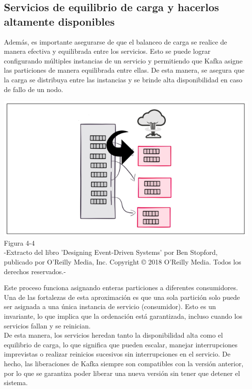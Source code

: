 \documentclass{article}
\begin{document}
\subsection{Servicios de equilibrio de carga y hacerlos altamente disponibles}
Además, es importante asegurarse de que el balanceo de carga se realice de manera efectiva y equilibrada entre los servicios. Esto se puede lograr configurando múltiples instancias de un servicio y permitiendo que Kafka asigne las particiones de manera equilibrada entre ellas. De esta manera, se asegura que la carga se distribuya entre las instancias y se brinde alta disponibilidad en caso de fallo de un nodo.
\begin{center}
    \includegraphics[scale=0.8]{figure4.4.png}
    Figura 4-4\\
    -Extracto del libro 'Designing Event-Driven Systems' por Ben Stopford, publicado por O'Reilly Media, Inc. Copyright © 2018 O'Reilly Media. Todos los derechos reservados.-
\end{center}
Este proceso funciona asignando enteras particiones a diferentes consumidores. Una de las fortalezas de esta aproximación es que una sola partición solo puede ser asignada a una única instancia de servicio (consumidor). Esto es un invariante, lo que implica que la ordenación está garantizada, incluso cuando los servicios fallan y se reinician.\\

De esta manera, los servicios heredan tanto la disponibilidad alta como el equilibrio de carga, lo que significa que pueden escalar, manejar interrupciones imprevistas o realizar reinicios sucesivos sin interrupciones en el servicio. De hecho, las liberaciones de Kafka siempre son compatibles con la versión anterior, por lo que se garantiza poder liberar una nueva versión sin tener que detener el sistema.
\end{document}
